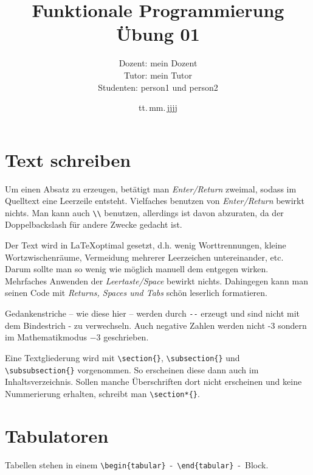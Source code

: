 \documentclass[
	10pt,
	parskip=half-,		%
	paper=a4,			%
	english, ngerman		%
	]{scrartcl}			%
\title{Funktionale Programmierung\\ Übung 01}
\author{Dozent: mein Dozent\\%
		Tutor: mein Tutor\\%
		Studenten: person1 und person2}
\date{tt.\,mm.\,jjjj}%
\begin{document}
\maketitle			%
\newpage				%
\tableofcontents		%
\newpage				%

\section{Text schreiben}
Um einen Absatz zu erzeugen, betätigt man \emph{Enter/Return} zweimal, sodass im Quelltext eine Leerzeile entsteht. Vielfaches benutzen von \emph{Enter/Return} bewirkt nichts. Man kann auch \verb|\\| benutzen, allerdings ist davon abzuraten, da der Doppelbackslash für andere Zwecke gedacht ist.

Der Text wird in \LaTeX optimal gesetzt, d.h. wenig Worttrennungen, kleine Wortzwischenräume, Vermeidung mehrerer Leerzeichen untereinander, etc. Darum sollte man so wenig wie möglich manuell dem entgegen wirken. Mehrfaches Anwenden der \emph{Leertaste/Space} bewirkt nichts. Dahingegen kann man seinen Code mit \emph{Returns, Spaces und Tabs} schön leserlich formatieren.

Gedankenstriche -- wie diese hier -- werden durch \verb|--| erzeugt und sind nicht mit dem Bindestrich - zu verwechseln. Auch negative Zahlen werden nicht -3 sondern im Mathematikmodus $-3$ geschrieben.

Eine Textgliederung wird mit \verb|\section{}|, \verb|\subsection{}| und \verb|\subsubsection{}| vorgenommen. So erscheinen diese dann auch im Inhaltsverzeichnis. Sollen manche Überschriften dort nicht erscheinen und keine Nummerierung erhalten, schreibt man \verb|\section*{}|.

\section{Tabulatoren}
Tabellen stehen in einem \verb|\begin{tabular}|~-~\verb|\end{tabular}|~-~Block.
\end{document}
